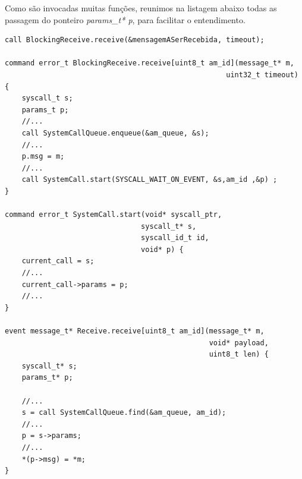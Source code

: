 Como são invocadas muitas funções, reunimos na listagem abaixo todas as passagem do ponteiro \textit{params\_t* p}, para
facilitar o entendimento.
\begin{lstlisting}
call BlockingReceive.receive(&mensagemASerRecebida, timeout);

command error_t BlockingReceive.receive[uint8_t am_id](message_t* m,
                                                    uint32_t timeout) {
    syscall_t s;
    params_t p;
    //...
    call SystemCallQueue.enqueue(&am_queue, &s);
    //...
    p.msg = m;
    //...
    call SystemCall.start(SYSCALL_WAIT_ON_EVENT, &s,am_id ,&p) ;
}

command error_t SystemCall.start(void* syscall_ptr,
                                syscall_t* s, 
                                syscall_id_t id, 
                                void* p) {
    current_call = s;
    //...
    current_call->params = p;
    //...
}

event message_t* Receive.receive[uint8_t am_id](message_t* m,
                                                void* payload,
                                                uint8_t len) {
    syscall_t* s;
    params_t* p;

    //...
    s = call SystemCallQueue.find(&am_queue, am_id);
    //...
    p = s->params;
    //...
    *(p->msg) = *m;
}
\end{lstlisting}
